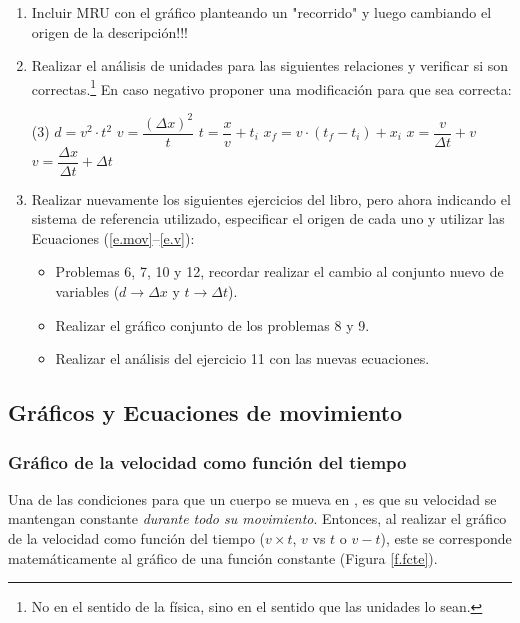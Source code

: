 \begin{enumerate}
  \item Incluir MRU con el gráfico planteando un "recorrido" y luego cambiando
  el origen de la descripción!!!

  \item Realizar el análisis de unidades para las siguientes relaciones y
    verificar si son correctas.\footnote{No en el sentido de la física, sino en el
    sentido que las unidades lo sean.} En caso negativo proponer una modificación para
    que sea correcta:
    \begin{tasks}(3)
      \task $d = v^2\cdot t^2$
      \task $v = \dfrac{(\Delta x)^2}{t}$
      \task $t = \dfrac{x}{v}+t_i$
      \task $x_f = v\cdot (t_f - t_i) + x_i$
      \task $x = \dfrac{v}{\Delta t}+v$
      \task $v = \dfrac{\Delta x}{\Delta t} + \Delta t$
    \end{tasks}

  \item Realizar nuevamente los siguientes ejercicios del libro, pero ahora
    indicando el sistema de referencia utilizado, especificar el origen de
    cada uno y utilizar las Ecuaciones (\ref{e.mov}--\ref{e.v}):
    \begin{itemize}
      \item Problemas 6, 7, 10 y 12, recordar realizar el cambio al
	conjunto nuevo de variables ($d \to \Delta x$ y $t \to \Delta t$).
      \item Realizar el gráfico conjunto de los problemas 8 y 9.
      \item Realizar el análisis del ejercicio 11 con las nuevas ecuaciones.
    \end{itemize}

\end{enumerate}
\normalsize


\subsection{Gráficos y Ecuaciones de movimiento}

\subsubsection{Gráfico de la velocidad como función del tiempo}
\label{c.vxt}

Una de las condiciones para que un cuerpo se mueva en \mru, es que su velocidad
se mantengan constante \textit{durante todo su movimiento}. Entonces, al
realizar el gráfico de la velocidad como función del tiempo ($v \times t$, $v$
vs $t$ o $v-t$), este se corresponde matemáticamente al gráfico de una función
constante (Figura \ref{f.fcte}). 

